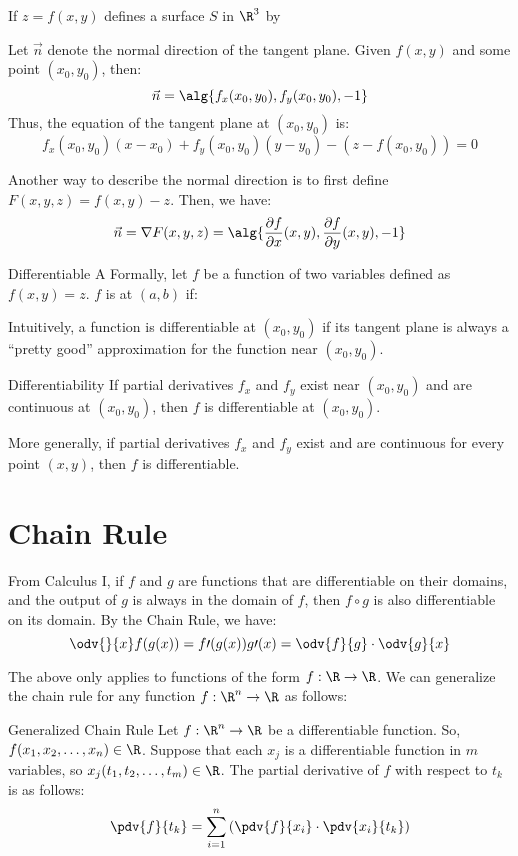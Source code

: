 If $z = f(x,y)$ defines a surface $S$ in $\R^3$ by 

Let $\vec{n}$ denote the normal direction of the tangent plane. Given $f(x,y)$ and some point $(x_0, y_0)$, then:
\[ \vec{n} = \alg{f_x(x_0, y_0), f_y(x_0, y_0), -1} \]
Thus, the equation of the tangent plane at $(x_0, y_0)$ is:
\[ f_x(x_0, y_0) (x - x_0) + f_y(x_0, y_0) (y - y_0) - (z - f(x_0, y_0)) = 0 \]

Another way to describe the normal direction is to first define $F(x,y,z) = f(x,y) - z$. Then, we have:
\[ \vec{n} = \nabla F(x,y,z) = \alg{ \frac{\partial f}{\partial x} (x,y) , \frac{\partial f}{\partial y} (x,y), -1 } \]

\begin{dfnbox}{Differentiable}{}
    A
    \tcblower
    Formally, let $f$ be a function of two variables defined as $f(x,y) = z$. $f$ is  at $(a,b)$ if:
\end{dfnbox}

Intuitively, a function is differentiable at $(x_0, y_0)$ if its tangent plane is always a ``pretty good'' approximation for the function near $(x_0, y_0)$.

\begin{thmbox}{Differentiability}{}
    If partial derivatives $f_x$ and $f_y$ exist near $(x_0, y_0)$ and are continuous at $(x_0, y_0)$, then $f$ is differentiable at $(x_0, y_0)$.
\end{thmbox}

More generally, if partial derivatives $f_x$ and $f_y$ exist and are continuous for every point $(x,y)$, then $f$ is differentiable.

\section{Chain Rule}

From Calculus I, if $f$ and $g$ are functions that are differentiable on their domains, and the output of $g$ is always in the domain of $f$, then $f \circ g$ is also differentiable on its domain. By the Chain Rule, we have:
\[ \odv{}{x} f(g(x)) = f \prime (g(x)) g\prime(x) = \odv{f}{g} \cdot \odv{g}{x} \]

The above only applies to functions of the form $f : \R \to \R$. We can generalize the chain rule for any function $f : \R^n \to \R$ as follows:

\begin{thmbox}{Generalized Chain Rule}{}
    Let $f : \R^n \to \R$ be a differentiable function. So, $f(x_1, x_2, \ldots, x_n) \in \R$. Suppose that each $x_j$ is a differentiable function in $m$ variables, so $x_j(t_1, t_2, \ldots, t_m) \in \R$. The partial derivative of $f$ with respect to $t_k$ is as follows:
    \[ \pdv{f}{t_k} = \sum_{i = 1}^{n} \left( \pdv{f}{x_i} \cdot \pdv{x_i}{t_k} \right) \]
\end{thmbox}

